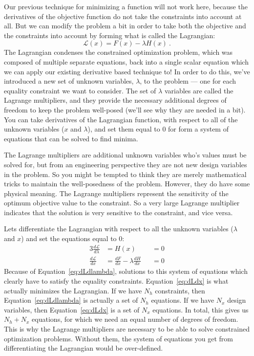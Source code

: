 \documentclass[conf]{new-aiaa}
\begin{document}
        Our previous technique for minimizing a function will not work here, because the derivatives of the objective function do not take the constraints into account at all. 
        But we can modify the problem a bit in order to take both the objective and the constraints into account by forming what is called the Lagrangian:  
        \begin{equation}
            \mathcal{L}(x) = F(x) - \lambda H(x) \ .
        \end{equation}
        The Lagrangian condenses the constrained optimization problem, which was composed of multiple separate equations, back into a single scalar equation which we can apply our existing derivative based technique to! 
        In order to do this, we've introduced a new set of unknown variables, $\lambda$, to the problem --- one for each equality constraint we want to consider. 
        The set of $\lambda$ variables are called the Lagrange multipliers, and they provide the necessary additional degrees of freedom to keep the problem well-posed (we'll see why they are needed in a bit). 
        You can take derivatives of the Lagrangian function, with respect to all of the unknown variables ($x$ and $\lambda$), and set them equal to 0 for form a system of equations that can be solved to find minima. 


        The Lagrange multipliers are additional unknown variables who's values must be solved for, but from an engineering perspective they are not new design variables in the problem. 
        So you might be tempted to think they are merely mathematical tricks to maintain the well-posedness of the problem. 
        However, they do have some physical meaning. 
        The Lagrange multipliers represent the sensitivity of the optimum objective value to the constraint. 
        So a very large Lagrange multiplier indicates that the solution is very sensitive to the constraint, and vice versa. 


        Lets differentiate the Lagrangian with respect to all the unknown variables ($\lambda$ and $x$) and set the equations equal to 0: 
        \begin{alignat}{3}
            \frac{d\mathcal{L}}{d\lambda} &= H(x) &&= 0 \label{eq:dLdlambda} \\
            \frac{d\mathcal{L}}{dx} &= \frac{dF}{dx} - \lambda \frac{dH}{dx} &&= 0 \label{eq:dLdx}
        \end{alignat}
        Because of Equation~\eqref{eq:dLdlambda}, solutions to this system of equations which clearly have to satisfy the equality constraints. 
        Equation~\eqref{eq:dLdx} is what actually minimizes the Lagrangian.
        If we have $N_h$ constraints, then  Equation~\eqref{eq:dLdlambda} is actually a set of $N_h$ equations. 
        If we have $N_x$ design variables, then Equation~\eqref{eq:dLdx} is a set of $N_x$ equations. 
        In total, this gives us $N_h + N_x$ equations, for which we need an equal number of degrees of freedom. 
        This is why the Lagrange multipliers are necessary to be able to solve constrained optimization problems. 
        Without them, the system of equations you get from differentiating the Lagrangian would be over-defined. 
\end{document}
